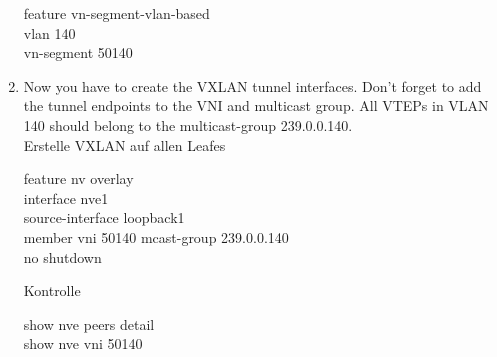 \documentclass[11pt,titlepage]{article}
\newenvironment{shadedquotation}
 {\begin{shaded*}
  \quoting[leftmargin=0pt, vskip=0pt]
 }
 {\endquoting
 \end{shaded*}
}
\begin{document}
\begin{enumerate}
	\begin{shadedquotation}
		feature vn-segment-vlan-based \\
		vlan 140 \\
		vn-segment 50140
	\end{shadedquotation}
\item Now you have to create the VXLAN tunnel interfaces. Don’t forget to add the tunnel endpoints to the VNI and multicast group. All VTEPs in VLAN 140 should belong to the multicast-group 239.0.0.140. \\
	Erstelle VXLAN auf allen Leafes
	\begin{shadedquotation}
		feature nv overlay \\
		interface nve1 \\
		source-interface loopback1 \\
		member vni 50140 mcast-group 239.0.0.140 \\
		no shutdown
	\end{shadedquotation}
	Kontrolle
	\begin{shadedquotation}
		show nve peers detail \\
		show nve vni 50140
	\end{shadedquotation}
\end{enumerate}
\end{document}
